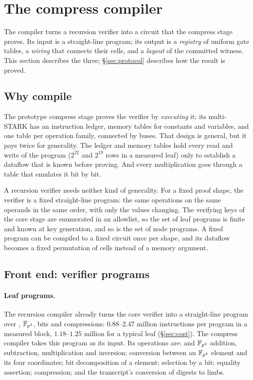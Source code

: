 \section{The compress compiler}\label{sec:compiler}

The compiler turns a recursion verifier into a circuit that the compress stage proves. Its input is a straight-line program; its output is a \emph{registry} of uniform gate tables, a \emph{wiring} that connects their cells, and a \emph{layout} of the committed witness. This section describes the three; \S\ref{sec:protocol} describes how the result is proved.

\subsection{Why compile}

The prototype compress stage proves the verifier by \emph{executing} it: its multi-STARK has an instruction ledger, memory tables for constants and variables, and one table per operation family, connected by buses. That design is general, but it pays twice for generality. The ledger and memory tables hold every read and write of the program ($2^{22}$ and $2^{19}$ rows in a measured leaf) only to establish a dataflow that is known before proving. And every \KB{} multiplication goes through a table that emulates it bit by bit.

A recursion verifier needs neither kind of generality. For a fixed proof shape, the verifier is a fixed straight-line program: the same operations on the same operands in the same order, with only the values changing. The verifying keys of the core stage are enumerated in an allowlist, so the set of leaf programs is finite and known at key generation, and so is the set of node programs. A fixed program can be compiled to a fixed circuit once per shape, and its dataflow becomes a fixed permutation of cells instead of a memory argument.

\subsection{Front end: verifier programs}

\paragraph{Leaf programs.} The recursion compiler already turns the core verifier into a straight-line program over \KB{}, $\mathbb{F}_{p^4}$, bits and \Blake{} compressions: $0.88$--$2.47$ million instructions per program in a measured block, $1.18$--$1.25$ million for a typical leaf (\S\ref{sec:cost}). The compress compiler takes this program as its input. Its operations are: \KB{} and $\mathbb{F}_{p^4}$ addition, subtraction, multiplication and inversion; conversion between an $\mathbb{F}_{p^4}$ element and its four \KB{} coordinates; bit decomposition of a \KB{} element; selection by a bit; equality assertion; \Blake{} compression; and the transcript's conversion of digests to \KB{} limbs.


